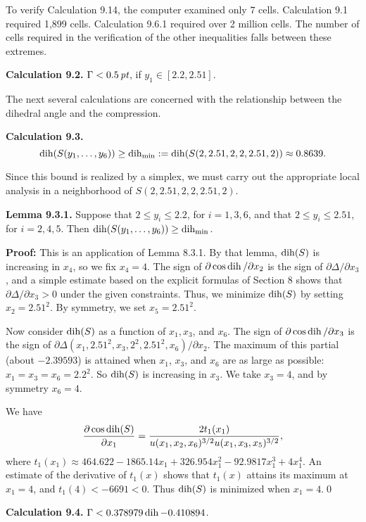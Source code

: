 To verify Calculation 9.14, the computer examined only $7$ cells.
Calculation 9.1 required
1,899 cells.  
Calculation 9.6.1
required over 2 million cells.  The number of cells required in
the verification of the other inequalities falls between these extremes.

\bigskip
{\bf Calculation 9.2.} $\Gamma < 0.5\,\hbox{\it pt}$, if $y_1\in [2.2,2.51]$.

\bigskip
The next several calculations are concerned with the relationship
between the dihedral angle and the compression.

\smallskip
{\bf Calculation 9.3.}  $$\operatorname{dih}(S(y_1,\ldots,y_6))\ge 
\operatorname{dih}_{\min} := \operatorname{dih}(S(2,2.51,2,2,2.51,2))
\approx 0.8639.$$

Since this bound is realized by a simplex, we must carry out the appropriate
local analysis in a neighborhood of $S(2,2.51,2,2,2.51,2)$.

\bigskip
{\bf Lemma 9.3.1.}  Suppose that $2\le y_i\le 2.2$, for $i=1,3,6$,
and that $2\le y_i\le 2.51$, for $i=2,4,5$.  Then
$\operatorname{dih}(S(y_1,\ldots,y_6))\ge \operatorname{dih}_{\min}$.

\bigskip
{\bf Proof:}  This is an application of Lemma 8.3.1.  By that
lemma, $\operatorname{dih}(S)$ is increasing in $x_4$, so we fix $x_4=4$.  
The sign of $\partial\cos\operatorname{dih}/\partial x_2$ is the sign of
$\partial\Delta/\partial x_3$, and a simple estimate based on the
explicit formulas of Section 8 shows that $\partial\Delta/\partial x_3>0$
under the given constraints.
Thus, we minimize $\operatorname{dih}(S)$ by setting $x_2=2.51^2$.  By symmetry,
we set $x_5=2.51^2$.

Now consider $\operatorname{dih}(S)$ as a function of $x_1,x_3$, and $x_6$.  
The sign of $\partial\cos\operatorname{dih}/\partial x_3$ is the sign of
$\partial\Delta(x_1,2.51^2,x_3,2^2,2.51^2,x_6)/\partial x_2$.
The maximum of this partial 
(about $-2.39593$) is attained when $x_1$, $x_3$, and $x_6$
are as large as possible: $x_1=x_3=x_6=2.2^2$.
So $\operatorname{dih}(S)$ is increasing in $x_3$.  We take $x_3=4$, and by symmetry
$x_6=4$.

We have
$$
{\partial \cos\operatorname{dih}(S)\over \partial x_1} = {2t_1(x_1)\over
                u(x_1,x_2,x_6)^{3/2} u(x_1,x_3,x_5)^{3/2}},$$
where $t_1(x_1)\approx 464.622-1865.14x_1+326.954x_1^2-92.9817x_1^3+4x_1^4$.
An estimate of the derivative of $t_1(x)$ shows that $t_1(x)$
attains its maximum at $x_1=4$,
and $t_1(4)< -6691<0$.  Thus $\operatorname{dih}(S)$ is minimized when
$x_1=4$.\qed


\bigskip

\smallskip
{\bf Calculation 9.4.}  $\Gamma < 0.378979\operatorname{dih} -0.410894$.

